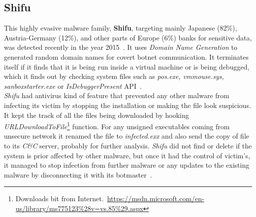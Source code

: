 \subsection{Shifu}
\label{sub:Shifu}
This highly evasive malware family, \textbf{Shifu}, targeting mainly Japanese (82\%), Austria-Germany (12\%), and other parts of Europe (6\%) banks for sensitive data, was detected recently in the year 2015~\cite[]{secintelshifu}.
It uses \emph{Domain Name Generation} to generated random domain names for covert botnet communication.
It terminates itself if it finds that it is being run inside a virtual machine or is being debugged, which it finds out by checking system files such as \emph{pos.exe, vmmouse.sys, sanboxstarter.exe} or \emph{IsDebuggerPresent} API~\cite[]{mccafeshifu}.\\
\emph{Shifu} had antivirus kind of feature that prevented any other malware from infecting its victim by stopping the installation or making the file look suspicious.
It kept the track of all the files being downloaded by hooking \textit{URLDownloadToFile}\footnote{Downloads bit from Internet.\ \url{https://msdn.microsoft.com/en-us/library/ms775123\%28v=vs.85\%29.aspx}} function.
For any unsigned executables coming from unsecure network it renamed the file to \emph{infected.exx} and also send the copy of file to its \emph{C\&C} server, probably for further analysis.
\emph{Shifu} did not find or delete if the system is prior affected by other malware, but once it had the control of victim's, it managed to stop infection from further malware or any updates to the existing malware by disconnecting it with its botmaster~\cite[]{secintelshifu}.
